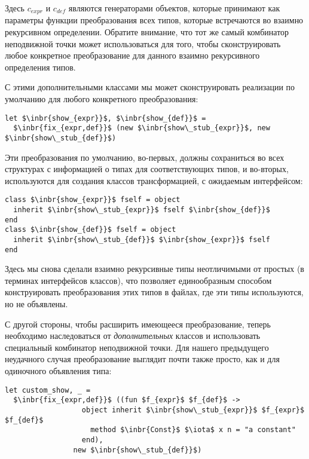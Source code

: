 Здесь $c_{expr}$ и $c_{def}$ являются генераторами объектов, которые принимают как параметры функции преобразования всех типов, которые встречаются во взаимно рекурсивном определении. Обратите внимание, что тот же самый комбинатор неподвижной точки может использоваться для того, чтобы сконструировать любое конкретное преобразование для данного взаимно рекурсивного определения типов.

С этими дополнительными классами мы может сконструировать реализации по умолчанию для любого конкретного преобразования:

\begin{lstlisting}
let $\inbr{show_{expr}}$, $\inbr{show_{def}}$ =
  $\inbr{fix_{expr,def}}$ (new $\inbr{show\_stub_{expr}}$, new $\inbr{show\_stub_{def}}$) 
\end{lstlisting}

Эти преобразования по умолчанию, во-первых, должны сохраниться во всех структурах с информацией о типах для соответствующих типов, и во-вторых, используются для создания классов трансформацией, с ожидаемым интерфейсом:

\begin{lstlisting}
class $\inbr{show_{expr}}$ fself = object 
  inherit $\inbr{show\_stub_{expr}}$ fself $\inbr{show_{def}}$ 
end
class $\inbr{show_{def}}$ fself = object 
  inherit $\inbr{show\_stub_{def}}$ $\inbr{show_{expr}}$ fself 
end
\end{lstlisting}

Здесь мы снова сделали взаимно рекурсивные типы неотличимыми от простых (в терминах интерфейсов классов), что позволяет единообразным способом конструировать преобразования этих типов в файлах, где эти типы используются, но не объявлены.

С другой стороны, чтобы расширить имеющееся преобразование, теперь необходимо наследоваться от \emph{дополнительных} классов и использовать специальный комбинатор неподвижной точки.
Для нашего предыдущего неудачного случая преобразование выглядит почти также просто, как и для одиночного объявления типа:

\begin{lstlisting}
let custom_show, _ =
  $\inbr{fix_{expr,def}}$ ((fun $f_{expr}$ $f_{def}$ ->
                  object inherit $\inbr{show\_stub_{expr}}$ $f_{expr}$ $f_{def}$
                    method $\inbr{Const}$ $\iota$ x n = "a constant"
                  end),
                new $\inbr{show\_stub_{def}}$) 
\end{lstlisting}

